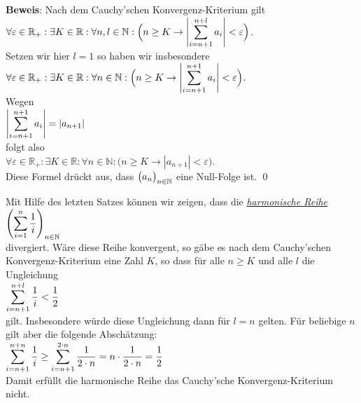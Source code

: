 \noindent
\textbf{Beweis}: Nach dem Cauchy'schen Konvergenz-Kriterium gilt \\[0.2cm]
\hspace*{1.3cm}      
$\displaystyle\forall \varepsilon \in \mathbb{R}_+:\exists K \in \mathbb{R}:\forall n,l \in \mathbb{N}: \Bigl(n \geq K \rightarrow \left|\sum\limits_{i=n+1}^{n+l} a_i \right| < \varepsilon\Bigr)$.
\\[0.2cm]
Setzen wir hier $l=1$ so haben wir insbesondere
\\[0.2cm]
\hspace*{1.3cm}
$\displaystyle\forall \varepsilon \in \mathbb{R}_+:\exists K \in \mathbb{R}:\forall n \in \mathbb{N}: \Bigl(n \geq K \rightarrow \left|\sum\limits_{i=n+1}^{n+1} a_i \right| < \varepsilon\Bigr)$. 
\\[0.2cm]
Wegen \\[0.2cm]
      \hspace*{1.3cm}      
      $\displaystyle\left|\sum\limits_{i=n+1}^{n+1} a_i \right| = |a_{n+1}|$
      \\[0.2cm]
folgt also 
\\[0.2cm]
\hspace*{1.3cm}
$\forall \varepsilon \in \mathbb{R}_+:\exists K \in \mathbb{R}:\forall n \in \mathbb{N}: \bigl(n \geq K \rightarrow |a_{n+1}| < \varepsilon\bigr)$.      
\\[0.2cm]
Diese Formel dr\"uckt aus, dass $\bigl(a_n\bigr)_{n\in\mathbb{N}}$ eine Null-Folge ist.
\qed

\remark
Mit Hilfe des letzten Satzes k\"onnen wir zeigen, dass die 
\href{http://de.wikipedia.org/wiki/Harmonische_Reihe}{\emph{harmonische Reihe}}
\\[0.2cm]
\hspace*{1.3cm}
$\displaystyle\left(\sum\limits_{i=1}^{n} \frac{1}{i}\right)_{n\in\mathbb{N}} $
\\[0.2cm]
divergiert.  W\"are diese Reihe konvergent, so g\"abe es nach dem Cauchy'schen
Konvergenz-Kriterium eine Zahl $K$, so dass f\"ur alle $n \geq K$ und alle $l$ die Ungleichung
\\[0.2cm]
\hspace*{1.3cm}
$\displaystyle \sum\limits_{i=n+1}^{n+l} \frac{1}{i} < \frac{1}{2} $
\\[0.2cm]
gilt.  Insbesondere w\"urde diese Ungleichung dann f\"ur $l=n$ gelten. 
F\"ur beliebige $n$ gilt aber die folgende Absch\"atzung:
\\[0.2cm]
\hspace*{1.3cm}
$\displaystyle\sum\limits_{i=n+1}^{n+n} \frac{1}{i}  \geq  \sum\limits_{i=n+1}^{2 \cdot n} \frac{1}{2 \cdot n} = n \cdot  \frac{1}{2 \cdot n} = \frac{1}{2}$
\\[0.2cm]
Damit erf\"ullt die harmonische Reihe das Cauchy'sche Konvergenz-Kriterium nicht. \eox

